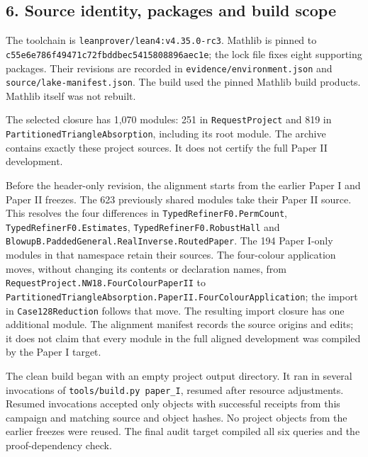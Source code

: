 \documentclass[english,11pt,a4paper]{article}
\begin{document}
\subsection{6. Source identity, packages and build scope}\label{source-identity-packages-and-build-scope}

The toolchain is \texttt{leanprover/\allowbreak{}lean4:v4.\allowbreak{}35.\allowbreak{}0-rc3}. Mathlib is pinned to \texttt{c55e6e78\allowbreak{}6f49471c\allowbreak{}72fbddbe\allowbreak{}c5415808\allowbreak{}896aec1e}; the lock file fixes eight supporting packages. Their revisions are recorded in \texttt{evidence/\allowbreak{}environment.\allowbreak{}json} and \texttt{source/\allowbreak{}lake-manifest.\allowbreak{}json}. The build used the pinned Mathlib build products. Mathlib itself was not rebuilt.

The selected closure has 1,070 modules: 251 in \texttt{Request\allowbreak{}Project} and 819 in \texttt{Partitioned\allowbreak{}Triangle\allowbreak{}Absorption}, including its root module. The archive contains exactly these project sources. It does not certify the full Paper II development.

Before the header-only revision, the alignment starts from the earlier Paper I and Paper II freezes. The 623 previously shared modules take their Paper II source. This resolves the four differences in \texttt{Typed\allowbreak{}Refiner\allowbreak{}F0.\allowbreak{}Perm\allowbreak{}Count}, \texttt{Typed\allowbreak{}Refiner\allowbreak{}F0.\allowbreak{}Estimates}, \texttt{Typed\allowbreak{}Refiner\allowbreak{}F0.\allowbreak{}Robust\allowbreak{}Hall} and \texttt{Blowup\allowbreak{}B.\allowbreak{}Padded\allowbreak{}General.\allowbreak{}Real\allowbreak{}Inverse.\allowbreak{}Routed\allowbreak{}Paper}. The 194 Paper I-only modules in that namespace retain their sources. The four-colour application moves, without changing its contents or declaration names, from \texttt{Request\allowbreak{}Project.\allowbreak{}NW18.\allowbreak{}Four\allowbreak{}Colour\allowbreak{}Paper\allowbreak{}II} to \texttt{Partitioned\allowbreak{}Triangle\allowbreak{}Absorption.\allowbreak{}Paper\allowbreak{}II.\allowbreak{}Four\allowbreak{}Colour\allowbreak{}Application}; the import in \texttt{Case128Reduction} follows that move. The resulting import closure has one additional module. The alignment manifest records the source origins and edits; it does not claim that every module in the full aligned development was compiled by the Paper I target.

The clean build began with an empty project output directory. It ran in several invocations of \texttt{tools/\allowbreak{}build.\allowbreak{}py\ paper\_\allowbreak{}I}, resumed after resource adjustments. Resumed invocations accepted only objects with successful receipts from this campaign and matching source and object hashes. No project objects from the earlier freezes were reused. The final audit target compiled all six queries and the proof-dependency check.
\end{document}
